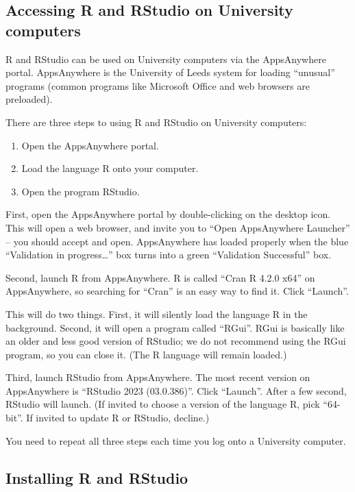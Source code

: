 \documentclass[
  a4paper,
]{book}
\providecommand{\tightlist}{%
  \setlength{\itemsep}{0pt}\setlength{\parskip}{0pt}}
\theoremstyle{definition}
\theoremstyle{definition}
\theoremstyle{definition}
\theoremstyle{definition}
\theoremstyle{remark}
\begin{document}
\hypertarget{r-uni}{%
\subsection*{Accessing R and RStudio on University computers}\label{r-uni}}

R and RStudio can be used on University computers via the AppsAnywhere portal. AppsAnywhere is the University of Leeds system for loading ``unusual'' programs (common programs like Microsoft Office and web browsers are preloaded).

There are three steps to using R and RStudio on University computers:

\begin{enumerate}
\def\labelenumi{\arabic{enumi}.}
\tightlist
\item
  Open the AppsAnywhere portal.
\item
  Load the language R onto your computer.
\item
  Open the program RStudio.
\end{enumerate}

First, open the AppsAnywhere portal by double-clicking on the desktop icon. This will open a web browser, and invite you to ``Open AppsAnywhere Launcher'' -- you should accept and open. AppsAnywhere has loaded properly when the blue ``Validation in progress\ldots{}'' box turns into a green ``Validation Successful'' box.

Second, launch R from AppsAnywhere. R is called ``Cran R 4.2.0 x64'' on AppsAnywhere, so searching for ``Cran'' is an easy way to find it. Click ``Launch''.

This will do two things. First, it will silently load the language R in the background. Second, it will open a program called ``RGui''. RGui is basically like an older and less good version of RStudio; we do not recommend using the RGui program, so you can close it. (The R language will remain loaded.)

Third, launch RStudio from AppsAnywhere. The most recent version on AppsAnywhere is ``RStudio 2023 (03.0.386)''. Click ``Launch''. After a few second, RStudio will launch. (If invited to choose a version of the language R, pick ``64-bit''. If invited to update R or RStudio, decline.)

You need to repeat all three steps each time you log onto a University computer.

\hypertarget{r-install}{%
\subsection*{Installing R and RStudio}\label{r-install}}
\end{document}
